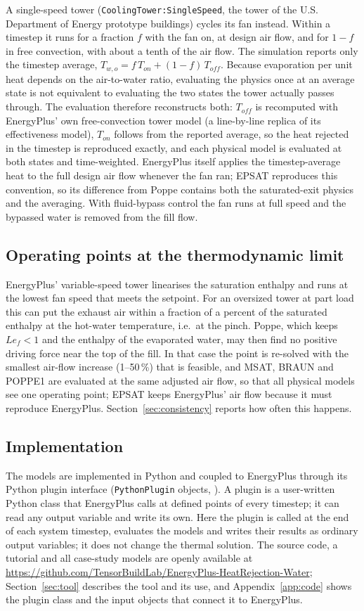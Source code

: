 \documentclass[preprint,12pt]{elsarticle}
\begin{document}
A single-speed tower (\texttt{CoolingTower:SingleSpeed}, the tower of the U.S. Department of Energy prototype
buildings) cycles its fan instead. Within a timestep it runs for a fraction $f$ with the fan on, at design air flow, and
for $1-f$ in free convection, with about a tenth of the air flow. The simulation reports only the timestep average,
$T_{w,o}=f\,T_{on}+(1-f)\,T_{off}$. Because evaporation per unit heat depends on the air-to-water ratio, evaluating the
physics once at an average state is not equivalent to evaluating the two states the tower actually passes through. The
evaluation therefore reconstructs both: $T_{off}$ is recomputed with EnergyPlus' own free-convection tower model (a
line-by-line replica of its effectiveness model), $T_{on}$ follows from the reported average, so the heat rejected in
the timestep is reproduced exactly, and each physical model is evaluated at both states and time-weighted. EnergyPlus
itself applies the timestep-average heat to the full design air flow whenever the fan ran; EPSAT reproduces this
convention, so its difference from Poppe contains both the saturated-exit physics and the averaging. With fluid-bypass
control the fan runs at full speed and the bypassed water is removed from the fill flow.

\subsection{Operating points at the thermodynamic limit}\label{sec:airflow}
EnergyPlus' variable-speed tower linearises the saturation enthalpy and runs at the lowest fan speed that meets the
setpoint. For an oversized tower at part load this can put the exhaust air within a fraction of a percent of the
saturated enthalpy at the hot-water temperature, i.e.\ at the pinch. Poppe, which keeps $Le_f<1$ and the enthalpy of the
evaporated water, may then find no positive driving force near the top of the fill. In that case the point is re-solved
with the smallest air-flow increase (1--50\,\%) that is feasible, and MSAT, BRAUN and POPPE1 are evaluated at the same
adjusted air flow, so that all physical models see one operating point; EPSAT keeps EnergyPlus' air flow because it must
reproduce EnergyPlus. Section~\ref{sec:consistency} reports how often this happens.

\subsection{Implementation}
The models are implemented in Python and coupled to EnergyPlus through its Python plugin interface
(\texttt{PythonPlugin} objects, \citep{doe2022ioref}). A plugin is a user-written Python class that EnergyPlus calls at
defined points of every timestep; it can read any output variable and write its own. Here the plugin is called at the
end of each system timestep, evaluates the models and writes their results as ordinary output variables; it does not
change the thermal solution. The source code, a tutorial and all case-study models are openly available at
\url{https://github.com/TensorBuildLab/EnergyPlus-HeatRejection-Water}; Section~\ref{sec:tool} describes the tool and
its use, and Appendix~\ref{app:code} shows the plugin class and the input objects that connect it to EnergyPlus.
\end{document}
